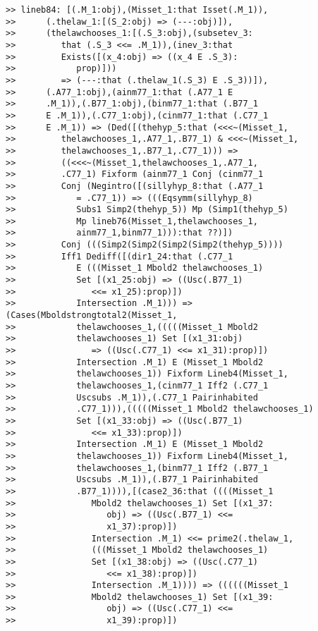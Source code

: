 \documentclass[12pt]{article}
\begin{document}
\begin{verbatim}
>> lineb84: [(.M_1:obj),(Misset_1:that Isset(.M_1)),
>>      (.thelaw_1:[(S_2:obj) => (---:obj)]),
>>      (thelawchooses_1:[(.S_3:obj),(subsetev_3:
>>         that (.S_3 <<= .M_1)),(inev_3:that
>>         Exists([(x_4:obj) => ((x_4 E .S_3):
>>            prop)]))
>>         => (---:that (.thelaw_1(.S_3) E .S_3))]),
>>      (.A77_1:obj),(ainm77_1:that (.A77_1 E
>>      .M_1)),(.B77_1:obj),(binm77_1:that (.B77_1
>>      E .M_1)),(.C77_1:obj),(cinm77_1:that (.C77_1
>>      E .M_1)) => (Ded([(thehyp_5:that (<<<~(Misset_1,
>>         thelawchooses_1,.A77_1,.B77_1) & <<<~(Misset_1,
>>         thelawchooses_1,.B77_1,.C77_1))) =>
>>         ((<<<~(Misset_1,thelawchooses_1,.A77_1,
>>         .C77_1) Fixform (ainm77_1 Conj (cinm77_1
>>         Conj (Negintro([(sillyhyp_8:that (.A77_1
>>            = .C77_1)) => (((Eqsymm(sillyhyp_8)
>>            Subs1 Simp2(thehyp_5)) Mp (Simp1(thehyp_5)
>>            Mp lineb76(Misset_1,thelawchooses_1,
>>            ainm77_1,binm77_1))):that ??)])
>>         Conj (((Simp2(Simp2(Simp2(Simp2(thehyp_5))))
>>         Iff1 Dediff([(dir1_24:that (.C77_1
>>            E (((Misset_1 Mbold2 thelawchooses_1)
>>            Set [(x1_25:obj) => ((Usc(.B77_1)
>>               <<= x1_25):prop)])
>>            Intersection .M_1))) => (Cases(Mboldstrongtotal2(Misset_1,
>>            thelawchooses_1,(((((Misset_1 Mbold2
>>            thelawchooses_1) Set [(x1_31:obj)
>>               => ((Usc(.C77_1) <<= x1_31):prop)])
>>            Intersection .M_1) E (Misset_1 Mbold2
>>            thelawchooses_1)) Fixform Lineb4(Misset_1,
>>            thelawchooses_1,(cinm77_1 Iff2 (.C77_1
>>            Uscsubs .M_1)),(.C77_1 Pairinhabited
>>            .C77_1))),(((((Misset_1 Mbold2 thelawchooses_1)
>>            Set [(x1_33:obj) => ((Usc(.B77_1)
>>               <<= x1_33):prop)])
>>            Intersection .M_1) E (Misset_1 Mbold2
>>            thelawchooses_1)) Fixform Lineb4(Misset_1,
>>            thelawchooses_1,(binm77_1 Iff2 (.B77_1
>>            Uscsubs .M_1)),(.B77_1 Pairinhabited
>>            .B77_1)))),[(case2_36:that ((((Misset_1
>>               Mbold2 thelawchooses_1) Set [(x1_37:
>>                  obj) => ((Usc(.B77_1) <<=
>>                  x1_37):prop)])
>>               Intersection .M_1) <<= prime2(.thelaw_1,
>>               (((Misset_1 Mbold2 thelawchooses_1)
>>               Set [(x1_38:obj) => ((Usc(.C77_1)
>>                  <<= x1_38):prop)])
>>               Intersection .M_1)))) => ((((((Misset_1
>>               Mbold2 thelawchooses_1) Set [(x1_39:
>>                  obj) => ((Usc(.C77_1) <<=
>>                  x1_39):prop)])

\end{verbatim}
\end{document}
